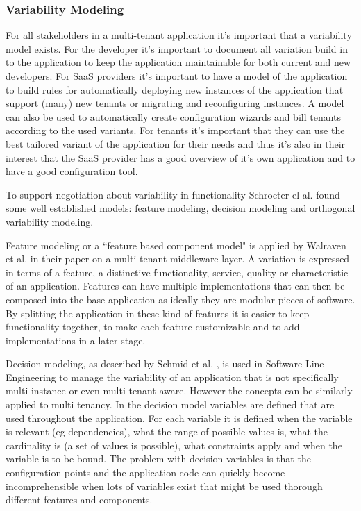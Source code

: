 
\subsubsection{Variability Modeling}
For all stakeholders in a multi-tenant application it's important that a variability model exists. For the developer it's important to document all variation build in to the application to keep the application maintainable for both current and new developers. 
For SaaS providers it's important to have a model of the application to build rules for automatically deploying new instances of the application that support (many) new tenants or migrating and reconfiguring instances. 
A model can also be used to automatically create configuration wizards and bill tenants according to the used variants. 
For tenants it's important that they can use the best tailored variant of the application for their needs and thus it's also in their interest that the SaaS provider has a good overview of it's own application and to have a good configuration tool.

To support negotiation about variability in functionality Schroeter el al. \cite{schroeter2012towards} found some well established models: feature modeling, decision modeling and orthogonal variability modeling.

Feature modeling or a ``feature based component model" is applied by Walraven et al. \cite{walraven2011middleware} in their paper on a multi tenant middleware layer. A variation is
expressed in terms of a feature, a distinctive functionality, service, quality or characteristic of an 
application. Features can have multiple implementations that can then be composed into the 
base application as ideally they are modular pieces of software. By splitting the application in 
these kind of features it is easier to keep functionality together, to make each feature 
customizable and to add implementations in a later stage.

Decision modeling, as described by Schmid et al. \cite{schmid2004customizable}, is used in 
Software Line Engineering to manage the variability of an application that is not specifically 
multi instance or even multi tenant aware. However the concepts can be similarly applied to 
multi tenancy. In the decision model variables are defined that are used throughout the 
application. For each variable it is defined when the variable is relevant (eg dependencies), 
what the range of possible values is, what the cardinality is (a set of values is possible), what 
constraints apply and when the variable is to be bound. The problem with decision variables is 
that the configuration points and the application code can quickly become incomprehensible 
when lots of variables exist that might be used thorough different features and components.

